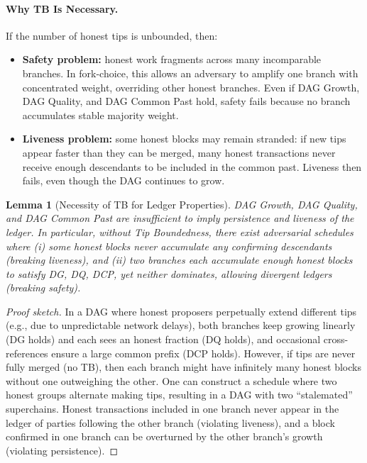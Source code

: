 \documentclass[11pt]{article}
\newtheorem{lemma}[theorem]{Lemma}
\begin{document}
\paragraph{Why TB Is Necessary.}
If the number of honest tips is unbounded, then:
\begin{itemize}
  \item \textbf{Safety problem:} honest work fragments across many incomparable branches. In fork-choice, this allows an adversary to amplify one branch with concentrated weight, overriding other honest branches. Even if DAG Growth, DAG Quality, and DAG Common Past hold, safety fails because no branch accumulates stable majority weight.
  \item \textbf{Liveness problem:} some honest blocks may remain stranded: if new tips appear faster than they can be merged, many honest transactions never receive enough descendants to be included in the common past. Liveness then fails, even though the DAG continues to grow.
\end{itemize}

\begin{lemma}[Necessity of TB for Ledger Properties]
DAG Growth, DAG Quality, and DAG Common Past are insufficient to imply persistence and liveness of the ledger. In particular, without Tip Boundedness, there exist adversarial schedules where (i) some honest blocks never accumulate any confirming descendants (breaking liveness), and (ii) two branches each accumulate enough honest blocks to satisfy DG, DQ, DCP, yet neither dominates, allowing divergent ledgers (breaking safety).
\end{lemma}

\begin{proof}[Proof sketch]
In a DAG where honest proposers perpetually extend different tips (e.g., due to unpredictable network delays), both branches keep growing linearly (DG holds) and each sees an honest fraction (DQ holds), and occasional cross-references ensure a large common prefix (DCP holds). However, if tips are never fully merged (no TB), then each branch might have infinitely many honest blocks without one outweighing the other. One can construct a schedule where two honest groups alternate making tips, resulting in a DAG with two ``stalemated'' superchains. Honest transactions included in one branch never appear in the ledger of parties following the other branch (violating liveness), and a block confirmed in one branch can be overturned by the other branch’s growth (violating persistence).
\end{proof}
\end{document}
